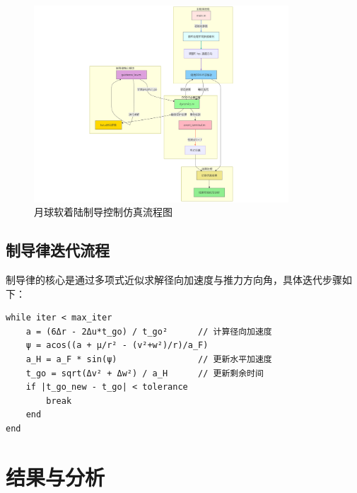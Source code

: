 \documentclass[12pt,a4paper]{article}
\begin{document}
\begin{figure}[H]
    \centering
    \includegraphics[width=0.85\textwidth]{figures/flowchart.png}  %
    \caption{月球软着陆制导控制仿真流程图}
    \label{fig:flow}
\end{figure}

\subsection{制导律迭代流程}
制导律的核心是通过多项式近似求解径向加速度与推力方向角，具体迭代步骤如下：
\begin{verbatim}
while iter < max_iter
    a = (6Δr - 2Δu*t_go) / t_go²      // 计算径向加速度
    ψ = acos((a + μ/r² - (v²+w²)/r)/a_F)
    a_H = a_F * sin(ψ)                // 更新水平加速度
    t_go = sqrt(Δv² + Δw²) / a_H      // 更新剩余时间
    if |t_go_new - t_go| < tolerance
        break
    end
end
\end{verbatim}

\section{结果与分析}
\end{document}
